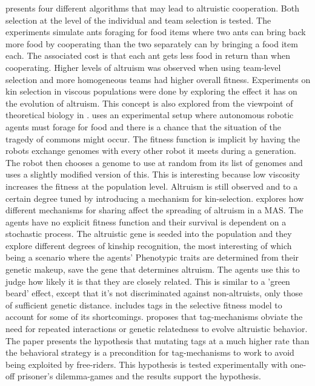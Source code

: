 \documentclass[a4paper]{book}
\begin{document}
\cite{floreano_evolution_2008} presents four different algorithms that may lead to altruistic cooperation. Both selection at the level of the individual and team selection is tested. The experiments simulate ants foraging for food items where two ants can bring back more food by cooperating than the two separately can by bringing a food item each. The associated cost is that each ant gets less food in return than when cooperating. Higher levels of altruism was observed when using team-level selection and more homogeneous teams had higher overall fitness. 
Experiments on kin selection in viscous populations were done by \cite{dulk_evolution_2000} exploring the effect it has on the evolution of altruism. This concept is also explored from the viewpoint of theoretical biology in \cite{joshua_mitteldorf_population_2000}. 
\cite{montanier_surviving_2011} uses an experimental setup where autonomous robotic agents must forage for food and there is a chance that the situation of the tragedy of commons might occur. The fitness function is implicit by having the robots exchange genomes with every other robot it meets during a generation. The robot then chooses a genome to use at random from its list of genomes and uses a slightly modified version of this. This is interesting because low viscosity increases the fitness at the population level. Altruism is still observed and to a certain degree tuned by introducing a mechanism for kin-selection. 
\cite{turner_stochastic_2003} explores how different mechanisms for sharing affect the spreading of altruism in a MAS. The agents have no explicit fitness function and their survival is dependent on a stochastic process. The altruistic gene is seeded into the population and they explore different degrees of kinship recognition, the most interesting of which being a scenario where the agents' Phenotypic traits are determined from their genetic makeup, save the gene that determines altruism. The agents use this to judge how likely it is that they are closely related. This is similar to a 'green beard' effect, except that it's not discriminated against non-altruists, only those of sufficient genetic distance.
\cite{ozisik_effects_2012} includes tags in the selective fitness model to account for some of its shortcomings.
\cite{hales_change_2005} proposes that tag-mechanisms obviate the need for repeated interactions or genetic relatedness to evolve altruistic behavior. The paper presents the hypothesis that mutating tags at a much higher rate than the behavioral strategy is a precondition for tag-mechanisms to work to avoid being exploited by free-riders. This hypothesis is tested experimentally with one-off prisoner's dilemma-games and the results support the hypothesis.
\end{document}
